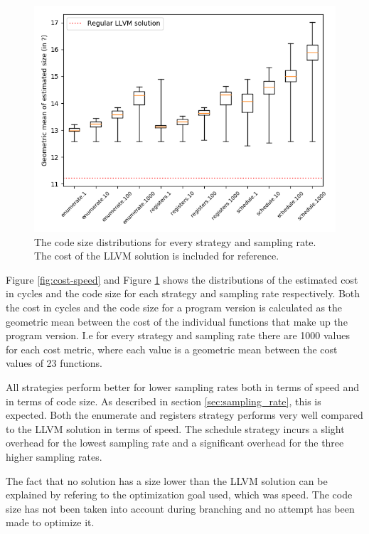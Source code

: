 \begin{figure}[h]
	\centering
	\includegraphics[width=\textwidth,height=0.5\textheight]{results/figures/cost_size}
	\caption{The code size distributions for every strategy and sampling rate. The cost of the LLVM solution is included for reference.}
	\label{fig:cost-size}
\end{figure}

Figure \ref{fig:cost-speed} and Figure \ref{fig:cost-size} shows the distributions of the
estimated cost in cycles and the code size for each strategy and sampling rate
respectively. Both the cost in cycles and the code size for a program version is
calculated as the geometric mean between the cost of the individual functions that make
up the program version. I.e for every strategy and sampling rate there are 1000 values for
each cost metric, where each value is a geometric mean between the cost values of 23
functions.

All strategies perform better for lower sampling rates both in terms of speed and in terms
of code size. As described in section \ref{sec:sampling_rate}, this is expected. Both the
enumerate and registers strategy performs very well compared to the LLVM solution
in terms of speed. The schedule strategy incurs a slight overhead for the lowest sampling
rate and a significant overhead for the three higher sampling rates.

The fact that no solution has a size lower than the LLVM solution can be explained by
refering to the optimization goal used, which was speed. The code size has not been taken
into account during branching and no attempt has been made to optimize it.

